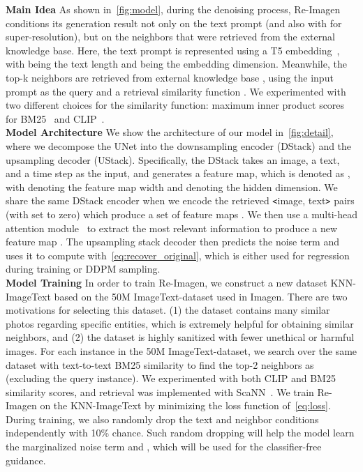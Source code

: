 \documentclass{article} \usepackage{iclr2023_conference,times}
\newcommand{\modelname}{{Re-Imagen}\xspace}
\begin{document}
\noindent \textbf{Main Idea} As shown in~\autoref{fig:model}, during the denoising process, \modelname conditions its generation result not only on the text prompt  (and also with  for super-resolution), but on the neighbors  that were retrieved from the external knowledge base. Here, the text prompt  is represented using a T5 embedding~\citep{raffel2020exploring}, with  being the text length and  being the embedding dimension. Meanwhile, the top-k neighbors  are retrieved from external knowledge base , using the input prompt  as the query and a retrieval similarity function . We experimented with two different choices for the similarity function: maximum inner product scores for BM25~\citep{robertson2009probabilistic} and CLIP~\citep{radford2021learning}. \vspace{1ex} \\
\noindent \textbf{Model Architecture} We show the architecture of our model in~\autoref{fig:detail}, where we decompose the UNet into the downsampling encoder (DStack) and the upsampling decoder (UStack). Specifically, the DStack takes an image, a text, and a time step as the input, and generates a feature map, which is denoted as , with  denoting the feature map width and  denoting the hidden dimension. We share the same DStack encoder when we encode the retrieved \texttt{<}image, text\texttt{>} pairs (with  set to zero) which produce a set of feature maps . We then use a multi-head attention module~\citep{vaswani2017attention} to extract the most relevant information to produce a new feature map . The upsampling stack decoder then predicts the noise term  and uses it to compute  with~\autoref{eq:recover_original}, which is either used for regression during training or DDPM sampling. \vspace{1ex} \\
\noindent \textbf{Model Training} In order to train \modelname, we construct a new dataset KNN-ImageText based on the 50M ImageText-dataset used in Imagen. There are two motivations for selecting this dataset. (1) the dataset contains many similar photos regarding specific entities, which is extremely helpful for obtaining similar neighbors, and (2) the dataset is highly sanitized with fewer unethical or harmful images. For each instance in the 50M ImageText-dataset, we search over the same dataset with text-to-text BM25 similarity to find the top-2 neighbors as  (excluding the query instance). We experimented with both CLIP and BM25 similarity scores, and retrieval was implemented with ScaNN~\citep{guo2020accelerating}. We train \modelname on the KNN-ImageText by minimizing the loss function of~\autoref{eq:loss}. During training, we also randomly drop the text and neighbor conditions independently with 10\% chance. Such random dropping will help the model learn the marginalized noise term  and , which will be used for the classifier-free guidance. \vspace{1ex} \\
\end{document}

